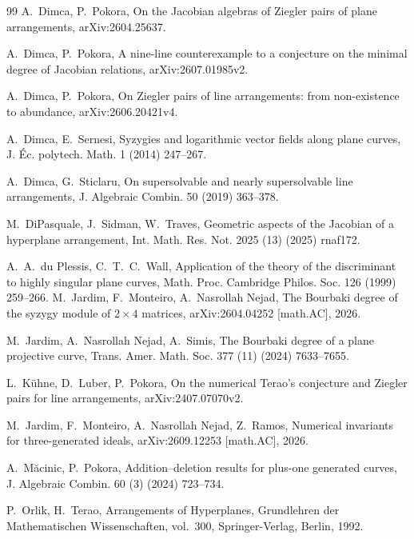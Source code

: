 \documentclass[11pt]{amsart}   %
\theoremstyle{definition}
\begin{document}
\begin{thebibliography}{99}
A.~Dimca, P.~Pokora,
On the Jacobian algebras of Ziegler pairs of plane arrangements,
arXiv:2604.25637.

A.~Dimca, P.~Pokora,
A nine-line counterexample to a conjecture on the minimal degree of
Jacobian relations,
arXiv:2607.01985v2.

A.~Dimca, P.~Pokora,
On Ziegler pairs of line arrangements: from non-existence to abundance,
arXiv:2606.20421v4.

A.~Dimca, E.~Sernesi,
Syzygies and logarithmic vector fields along plane curves,
J. \'{E}c. polytech. Math. 1 (2014) 247--267.

A.~Dimca, G.~Sticlaru,
On supersolvable and nearly supersolvable line arrangements,
J. Algebraic Combin. 50 (2019) 363--378.

M.~DiPasquale, J.~Sidman, W.~Traves,
Geometric aspects of the Jacobian of a hyperplane arrangement,
Int. Math. Res. Not. 2025 (13) (2025) rnaf172.

A.~A.~du Plessis, C.~T.~C.~Wall,
Application of the theory of the discriminant to highly singular
plane curves,
Math. Proc. Cambridge Philos. Soc. 126 (1999) 259--266.
M.~Jardim, F.~Monteiro, A.~Nasrollah Nejad,
The Bourbaki degree of the syzygy module of $2\times4$ matrices,
arXiv:2604.04252 [math.AC], 2026.


M.~Jardim, A.~Nasrollah Nejad, A.~Simis,
The Bourbaki degree of a plane projective curve,
Trans. Amer. Math. Soc. 377 (11) (2024) 7633--7655.

L.~K\"uhne, D.~Luber, P.~Pokora,
On the numerical Terao's conjecture and Ziegler pairs for line
arrangements,
arXiv:2407.07070v2.

M.~Jardim, F.~Monteiro, A.~Nasrollah Nejad, Z.~Ramos,
Numerical invariants for three-generated ideals,
arXiv:2609.12253 [math.AC], 2026.

A.~M\u{a}cinic, P.~Pokora,
Addition--deletion results for plus-one generated curves,
J. Algebraic Combin. 60 (3) (2024) 723--734.

P.~Orlik, H.~Terao,
Arrangements of Hyperplanes,
Grundlehren der Mathematischen Wissenschaften, vol.~300,
Springer-Verlag, Berlin, 1992.


\end{thebibliography}
\end{document}
